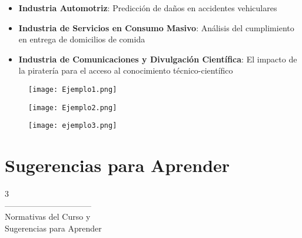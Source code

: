 \documentclass[aspectratio=169]{beamer}
\begin{document}
\begin{frame}
\begin{itemize}
\item \textbf{Industria Automotriz}: Predicción de daños en accidentes vehiculares \cite{Belaid2021}
\vspace{0.6cm}
\pause
\item \textbf{Industria de Servicios en Consumo Masivo}: Análisis del cumplimiento en entrega de domicilios de comida \cite{Correa2019}
\pause
\vspace{0.6cm}
\item \textbf{Industria de Comunicaciones y Divulgación Científica}: El impacto de la piratería para el acceso al conocimiento técnico-científico \cite{Correa2021}
\end{itemize}
\end{frame}


\begin{frame}
 \begin{figure}
\centering
 \texttt{[image: Ejemplo1.png]}
\end{figure}  
\end{frame}

\begin{frame}
 \begin{figure}
\centering
 \texttt{[image: Ejemplo2.png]}
\end{figure}  
\cite{Correa2019}
\end{frame}

\begin{frame}
 \begin{figure}
\centering
 \texttt{[image: ejemplo3.png]}
\end{figure}  
\cite{Correa2021}
\end{frame}

\section{Sugerencias para Aprender}
\begin{frame}
\begin{center}
\Huge
\textcolor{azulcesaclaro}{3\\
--------------------------------\\
Normativas del Curso y\\
Sugerencias para Aprender}
\end{center}
\end{frame}
\end{document}
